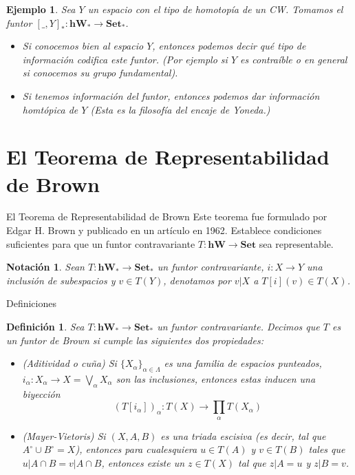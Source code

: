 \documentclass{beamer}
\newtheorem{df}{Definici\'on}
\newtheorem{ejem}{Ejemplo}
\newtheorem{no}{Notaci\'on}
\newcommand{\con}{\mathbf{Set}}
\newcommand{\W}{\mathbf{hW}}
\begin{document}
\begin{frame}
	\begin{ejem}
		Sea $Y$ un espacio con el tipo de homotopía de un CW. Tomamos el funtor $[\_, Y]_\ast\colon \mathbf{hW}_\ast\to \con_\ast$. 
		
		\begin{itemize}
			\item Si conocemos bien al espacio $Y$, entonces podemos decir qué tipo de información codifica este funtor. (Por ejemplo si $Y$ es contraíble o en general si conocemos su grupo fundamental).
			\item Si tenemos información del funtor, entonces podemos dar información homtópica de $Y$ (Esta es la filosofía del \emph{encaje de Yoneda}.)
		\end{itemize}
	\end{ejem}
\end{frame}

\section{El Teorema de Representabilidad de Brown}

\begin{frame}{El Teorema de Representabilidad de Brown}
	Este teorema fue formulado por Edgar H. Brown y publicado en un artículo en 1962. Establece condiciones suficientes para que un funtor contravariante $T\colon \mathbf{hW}\to \con$ sea representable. 
	\begin{no}
		Sean $T\colon \W_\ast \to \con_\ast$ un funtor contravariante, $i\colon X\to Y$ una inclusión de subespacios y $v\in T(Y)$, denotamos por $v|X$ a $T[i](v)          \in T(X)$.
	\end{no}
\end{frame}

\begin{frame}{Definiciones}	
	\begin{df}
		Sea $T\colon \W_\ast \to \con_\ast$ un funtor contravariante. Decimos que $T$ es un funtor de Brown si cumple las siguientes dos propiedades:
		\begin{itemize}
			\item (Aditividad o cuña) Si $\{X_\alpha\}_{\alpha\in\Lambda}$ es una familia de espacios punteados, $i_\alpha \colon X_\alpha \to X=\bigvee_\alpha X_\alpha$ son las inclusiones, entonces estas inducen una biyección 
			\[(T[i_\alpha ])_\alpha \colon T(X)\to \prod_\alpha T(X_\alpha)\]
			\item (Mayer-Vietoris) Si $(X,A,B)$ es una triada escisiva (es decir, tal que $A^\circ \cup B^\circ = X$), entonces para cualesquiera $u\in T(A)$ y $v\in T(B)$ tales que $u|A\cap B = v|A\cap B$, entonces existe un $z\in T(X)$ tal que $z|A=u$ y $z|B=v$. 
		\end{itemize}
	\end{df}
\end{frame}
\end{document}
